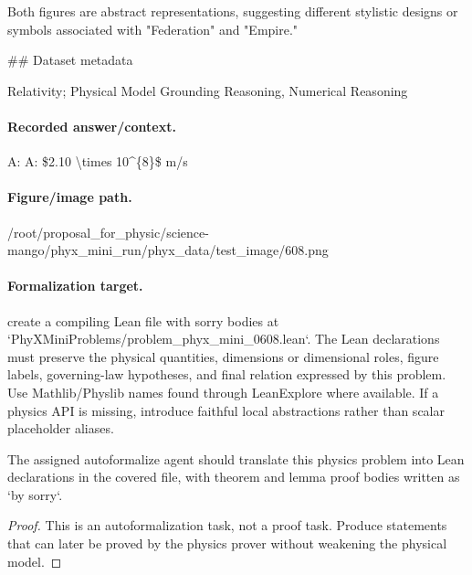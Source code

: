 Both figures are abstract representations, suggesting different stylistic designs or symbols associated with "Federation" and "Empire."

\#\# Dataset metadata

Relativity; Physical Model Grounding Reasoning, Numerical Reasoning

\paragraph{Recorded answer/context.}
A: A: \$2.10 \textbackslash{}times 10\textasciicircum{}\{8\}\$ m/s

\paragraph{Figure/image path.}
/root/proposal\_for\_physic/science-mango/phyx\_mini\_run/phyx\_data/test\_image/608.png

\paragraph{Formalization target.}
create a compiling Lean file with sorry bodies at `PhyXMiniProblems/problem\_phyx\_mini\_0608.lean`. The Lean declarations must preserve the physical quantities, dimensions or dimensional roles, figure labels, governing-law hypotheses, and final relation expressed by this problem.
Use Mathlib/Physlib names found through LeanExplore where available. If a physics API is missing, introduce faithful local abstractions rather than scalar placeholder aliases.

\begin{theorem}
\label{thm:physics:phyx_mini_0608:target}
The assigned autoformalize agent should translate this physics problem into Lean declarations in the covered file, with theorem and lemma proof bodies written as `by sorry`.
\end{theorem}
\begin{proof}
This is an autoformalization task, not a proof task. Produce statements that can later be proved by the physics prover without weakening the physical model.
\end{proof}

